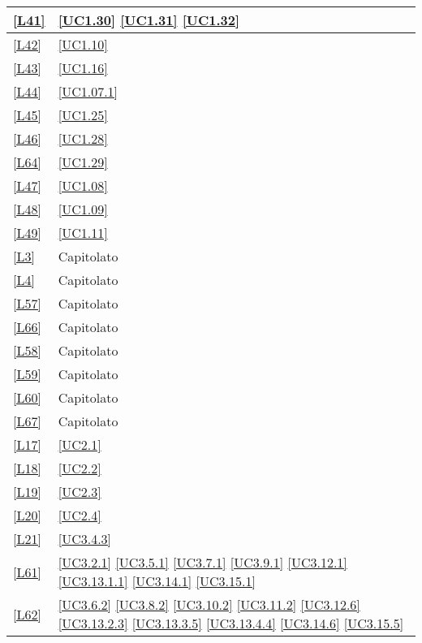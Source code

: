 \begin{longtable}{|P{6cm}|P{6cm}|}
	\hline \ref{L41} & \ref{UC1.30} \linebreak \ref{UC1.31} \linebreak \ref{UC1.32} \\
	\hline \ref{L42} & \ref{UC1.10} \\
	\hline \ref{L43} & \ref{UC1.16} \\
	\hline \ref{L44} & \ref{UC1.07.1} \\
	\hline \ref{L45} & \ref{UC1.25} \\
	\hline \ref{L46} & \ref{UC1.28} \\
	\hline \ref{L64} & \ref{UC1.29}  \\	 
	\hline \ref{L47} & \ref{UC1.08} \\
	\hline \ref{L48} & \ref{UC1.09} \\
	\hline \ref{L49} & \ref{UC1.11} \\
	\hline \ref{L3} & Capitolato \\
	\hline \ref{L4} & Capitolato \\	
	\hline \ref{L57} & Capitolato \\
	\hline \ref{L66} & Capitolato \\
	\hline \ref{L58} & Capitolato \\
	\hline \ref{L59} & Capitolato \\
	\hline \ref{L60} & Capitolato \\
	\hline \ref{L67} & Capitolato \\
	\hline \ref{L17} & \ref{UC2.1} \\
	\hline \ref{L18} & \ref{UC2.2} \\
	\hline \ref{L19} & \ref{UC2.3} \\
	\hline \ref{L20} & \ref{UC2.4} \\	
	\hline \ref{L21} & \ref{UC3.4.3} \\
	\hline \ref{L61} & \ref{UC3.2.1} \linebreak \ref{UC3.5.1} \linebreak \ref{UC3.7.1} \linebreak \ref{UC3.9.1} \linebreak \ref{UC3.12.1} \linebreak \ref{UC3.13.1.1} \linebreak \ref{UC3.14.1} \linebreak \ref{UC3.15.1} \\
	\hline \ref{L62} & \ref{UC3.6.2} \linebreak \ref{UC3.8.2} \linebreak \ref{UC3.10.2} \ref{UC3.11.2} \linebreak \ref{UC3.12.6}  \linebreak \ref{UC3.13.2.3} \linebreak \ref{UC3.13.3.5}  \linebreak \ref{UC3.13.4.4} \linebreak \ref{UC3.14.6} \linebreak \ref{UC3.15.5}\\

\end{longtable}

